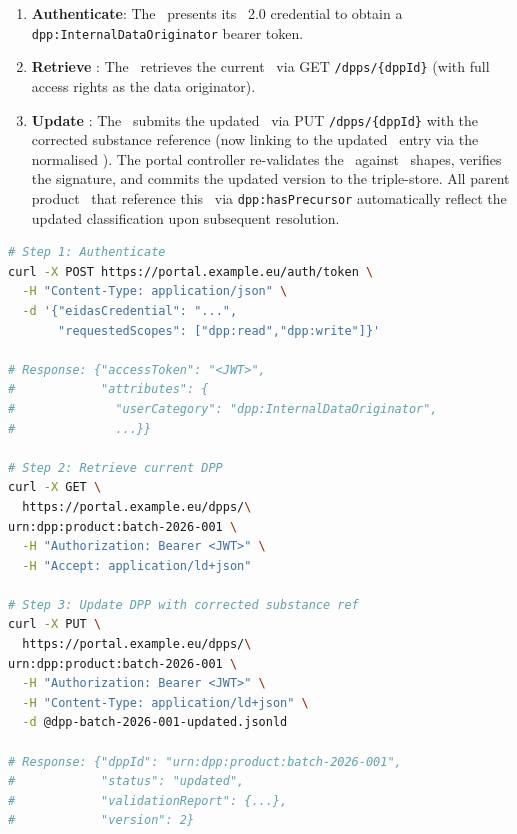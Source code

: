 \begin{enumerate}
\item \textbf{Authenticate}: The \REO\ presents its \eIDAS~2.0 credential to
obtain a \texttt{dpp:InternalDataOriginator} bearer token.
\item \textbf{Retrieve \DPP}: The \REO\ retrieves the current \DPP\ via GET
\texttt{/dpps/\{dppId\}} (with full access rights as the data originator).
\item \textbf{Update \DPP}: The \REO\ submits the updated \DPP\ via PUT
\texttt{/dpps/\{dppId\}} with the corrected substance reference (now linking to
the updated \ECHA\ entry via the normalised \IRI). The portal controller
re-validates the \DPP\ against \SHACL\ shapes, verifies the signature, and
commits the updated version to the triple-store. All parent product \DPPs\ that
reference this \DPP\ via \texttt{dpp:hasPrecursor} automatically reflect the
updated classification upon subsequent resolution.
\end{enumerate}

\begin{lstlisting}[language=bash,breaklines=true,breakatwhitespace=true]
# Step 1: Authenticate
curl -X POST https://portal.example.eu/auth/token \
  -H "Content-Type: application/json" \
  -d '{"eidasCredential": "...",
       "requestedScopes": ["dpp:read","dpp:write"]}'

# Response: {"accessToken": "<JWT>",
#            "attributes": {
#              "userCategory": "dpp:InternalDataOriginator",
#              ...}}

# Step 2: Retrieve current DPP
curl -X GET \
  https://portal.example.eu/dpps/\
urn:dpp:product:batch-2026-001 \
  -H "Authorization: Bearer <JWT>" \
  -H "Accept: application/ld+json"

# Step 3: Update DPP with corrected substance ref
curl -X PUT \
  https://portal.example.eu/dpps/\
urn:dpp:product:batch-2026-001 \
  -H "Authorization: Bearer <JWT>" \
  -H "Content-Type: application/ld+json" \
  -d @dpp-batch-2026-001-updated.jsonld

# Response: {"dppId": "urn:dpp:product:batch-2026-001",
#            "status": "updated",
#            "validationReport": {...},
#            "version": 2}
\end{lstlisting}
